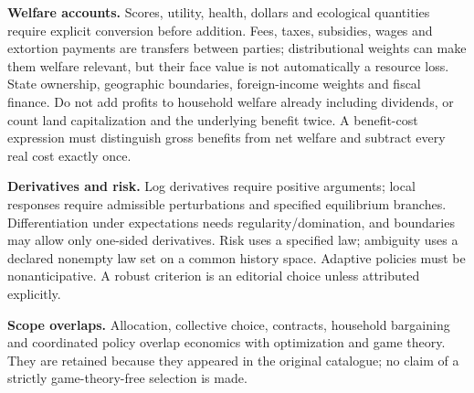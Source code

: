 \documentclass[11pt,a4paper]{article}
\begin{document}
\textbf{Welfare accounts.} Scores, utility, health, dollars and ecological quantities require explicit conversion before addition. Fees, taxes, subsidies, wages and extortion payments are transfers between parties; distributional weights can make them welfare relevant, but their face value is not automatically a resource loss. State ownership, geographic boundaries, foreign-income weights and fiscal finance. Do not add profits to household welfare already including dividends, or count land capitalization and the underlying benefit twice.
A benefit-cost expression must distinguish gross benefits from net welfare and subtract every real cost exactly once.

\textbf{Derivatives and risk.} Log derivatives require positive arguments; local responses require admissible perturbations and specified equilibrium branches. Differentiation under expectations needs regularity/domination, and boundaries may allow only one-sided derivatives. Risk uses a specified law; ambiguity uses a declared nonempty law set on a common history space. Adaptive policies must be nonanticipative. A robust criterion is an editorial choice unless attributed explicitly.

\textbf{Scope overlaps.} Allocation, collective choice, contracts, household bargaining and coordinated policy overlap economics with optimization and game theory. They are retained because they appeared in the original catalogue; no claim of a strictly game-theory-free selection is made.
\end{document}
